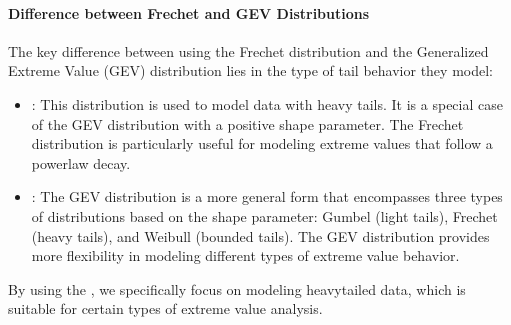 \documentclass[a4paper,11pt,openany,english]{sphinxmanual}
\begin{document}
\paragraph{Difference between Frechet and GEV Distributions}
\label{\detokenize{notebooks/estimators:Difference-between-Frechet-and-GEV-Distributions}}
\sphinxAtStartPar
The key difference between using the Frechet distribution and the Generalized Extreme Value (GEV) distribution lies in the type of tail behavior they model:
\begin{itemize}
\item {} 
\sphinxAtStartPar
{}: This distribution is used to model data with heavy tails. It is a special case of the GEV distribution with a positive shape parameter. The Frechet distribution is particularly useful for modeling extreme values that follow a power\sphinxhyphen{}law decay.

\item {} 
\sphinxAtStartPar
{}: The GEV distribution is a more general form that encompasses three types of distributions based on the shape parameter: Gumbel (light tails), Frechet (heavy tails), and Weibull (bounded tails). The GEV distribution provides more flexibility in modeling different types of extreme value behavior.

\end{itemize}

\sphinxAtStartPar
By using the , we specifically focus on modeling heavy\sphinxhyphen{}tailed data, which is suitable for certain types of extreme value analysis.
\end{document}
